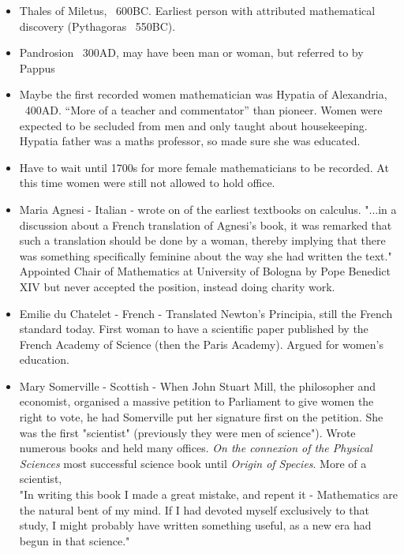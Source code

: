 \documentclass{article}
\begin{document}
\begin{itemize}
    \item Thales of Miletus, ~600BC. Earliest person with attributed mathematical discovery (Pythagoras ~550BC).
    
    
    \item Pandrosion ~300AD, may have been man or woman, but referred to by Pappus
    
    
    \item Maybe the first recorded women mathematician was Hypatia of Alexandria, ~400AD. “More of a teacher and commentator” than pioneer. Women were expected to be secluded from men and only taught about housekeeping. Hypatia father was a maths professor, so made sure she was educated. 
    
    
    \item Have to wait until 1700s for more female mathematicians to be recorded. At this time women were still not allowed to hold office. 
    
    
    \item Maria Agnesi - Italian - wrote on of the earliest textbooks on calculus. "...in a discussion about a French translation of Agnesi’s book, it was remarked that such a translation should be done by a woman, thereby implying that there was something specifically feminine about the way she had written the text." Appointed Chair of Mathematics at University of Bologna by Pope Benedict XIV but never accepted the position, instead doing charity work. 
    
    
    \item Emilie du Chatelet - French - Translated Newton's Principia, still the French standard today. First woman to have a scientific paper published by the French Academy of Science (then the Paris Academy). Argued for women's education.
    
    
    \item Mary Somerville - Scottish - When John Stuart Mill, the philosopher and economist, organised a massive petition to Parliament to give women the right to vote, he had Somerville put her signature first on the petition. She was the first "scientist" (previously they were men of science"). Wrote numerous books and held many offices. \textit{On the connexion of the Physical Sciences} most successful science book until \textit{Origin of Species}. More of a scientist, \\
    \newline
    "In writing this book I made a great mistake, and repent it - Mathematics are the natural bent of my mind. If I had devoted myself exclusively to that study, I might probably have written something useful, as a new era had begun in that science."
    \newline
    

\end{itemize}
\end{document}
